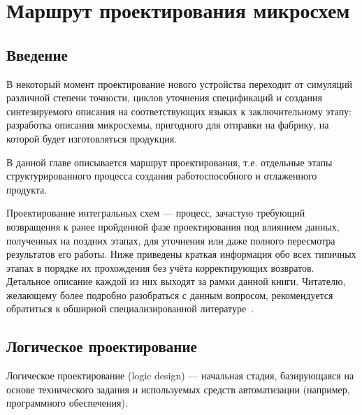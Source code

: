 
\chapter{Маршрут проектирования микросхем}\label{appendix:ic-route}


\section{Введение}
    
В некоторый момент проектирование нового устройства переходит от симуляций различной степени точности, циклов уточнения спецификаций и создания синтезируемого описания на соответствующих языках к заключительному этапу: разработка описания микросхемы, пригодного для отправки на фабрику, на которой будет изготовляться продукция.

В данной главе описывается маршрут проектирования, т.е. отдельные этапы структурированного процесса создания работоспособного и отлаженного продукта.

Проектирование интегральных схем — процесс, зачастую требующий возвращения к ранее пройденной фазе проектирования под влиянием данных, полученных на поздних этапах, для уточнения или даже полного пересмотра результатов его работы. Ниже приведены краткая информация обо всех типичных этапах в порядке их прохождения без учёта корректирующих возвратов. Детальное описание каждой из них выходят за рамки данной книги. Читателю, желающему более подробно разобраться с данным вопросом, рекомендуется обратиться к обширной специализированной литературе~\cite{books/daglib/0027783, dicd}.

\section{Логическое проектирование}

Логическое проектирование (\abbr logic design) — начальная стадия, базирующаяся на основе технического задания и используемых средств автоматизации (например, программного обеспечения).

